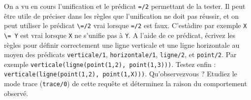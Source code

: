 \documentclass[a4paper]{article}
\newenvironment{CAnswer}{\color{red}\begin{Answer}}
                        {\end{Answer}}
\begin{document}
\begin{CAnswer}

\end{CAnswer}

\begin{Exercise}[title={Négation de l'unification}]
On a vu en cours l'unification et le prédicat \verb$=/2$ permettant de la
tester. Il peut être utile de préciser dans les règles que l'unification ne doit
pas réussir, et on peut utiliser le prédicat \verb$\=/2$ vrai lorsque \verb$=/2$
est faux. C'est­à­dire par exemple \verb$X \= Y$ est vrai lorsque \verb$X$ ne
s'unifie pas à \verb$Y$. A l'aide de ce prédicat, écrivez les règles pour
définir correctement une ligne verticale et une ligne horizontale au moyen des
prédicats \verb$verticale/1$, \verb$horizontale/1$, \verb$ligne/2$, et
\verb$point/2$. Par exemple \verb$verticale(ligne(point(1,2), point(1,3)))$.
Testez enfin : \verb$verticale(ligne(point(1,2), point(1,X)))$. Qu'observez­vous
? Etudiez le mode trace (\verb$trace/0$) de cette requête et déterminez la
raison du comportement observé.
\end{Exercise}
\begin{CAnswer}

\end{CAnswer}
\end{document}
